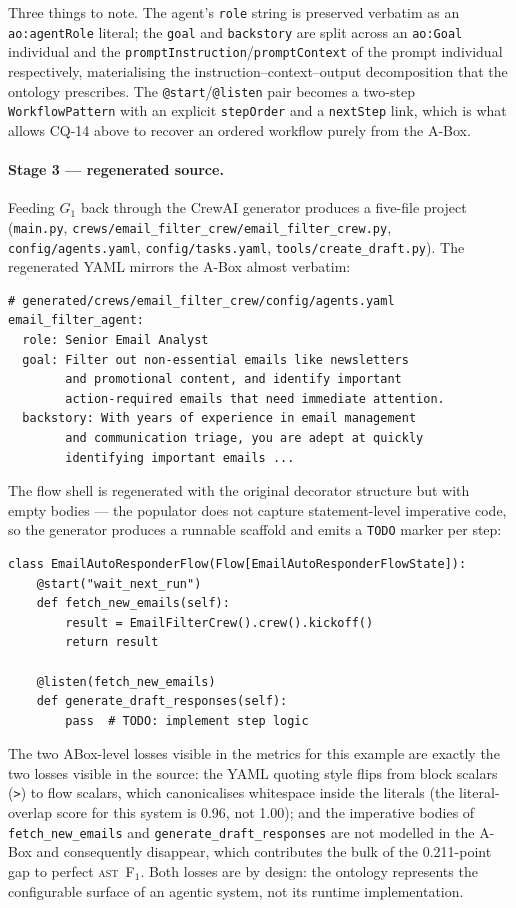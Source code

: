 Three things to note. The agent's \texttt{role} string is preserved
verbatim as an \texttt{ao:agentRole} literal; the \texttt{goal} and
\texttt{backstory} are split across an \texttt{ao:Goal} individual and
the \texttt{promptInstruction}/\texttt{promptContext} of the prompt
individual respectively, materialising the
instruction--context--output decomposition that the ontology
prescribes. The \texttt{@start}/\texttt{@listen} pair becomes a
two-step \texttt{WorkflowPattern} with an explicit \texttt{stepOrder}
and a \texttt{nextStep} link, which is what allows CQ-14 above to
recover an ordered workflow purely from the A-Box.

\paragraph{Stage 3 — regenerated source.}
Feeding $G_1$ back through the CrewAI generator produces a five-file
project (\texttt{main.py}, \texttt{crews/email\_filter\_crew/email\_filter\_crew.py},
\texttt{config/agents.yaml}, \texttt{config/tasks.yaml},
\texttt{tools/create\_draft.py}). The regenerated YAML mirrors the
A-Box almost verbatim:

\begin{verbatim}
# generated/crews/email_filter_crew/config/agents.yaml
email_filter_agent:
  role: Senior Email Analyst
  goal: Filter out non-essential emails like newsletters
        and promotional content, and identify important
        action-required emails that need immediate attention.
  backstory: With years of experience in email management
        and communication triage, you are adept at quickly
        identifying important emails ...
\end{verbatim}

The flow shell is regenerated with the original decorator structure
but with empty bodies — the populator does not capture statement-level
imperative code, so the generator produces a runnable scaffold and
emits a \texttt{TODO} marker per step:

\begin{verbatim}
class EmailAutoResponderFlow(Flow[EmailAutoResponderFlowState]):
    @start("wait_next_run")
    def fetch_new_emails(self):
        result = EmailFilterCrew().crew().kickoff()
        return result

    @listen(fetch_new_emails)
    def generate_draft_responses(self):
        pass  # TODO: implement step logic
\end{verbatim}

The two ABox-level losses visible in the metrics for this example are
exactly the two losses visible in the source: the YAML quoting style
flips from block scalars (\texttt{>}) to flow scalars, which
canonicalises whitespace inside the literals (the literal-overlap
score for this system is 0.96, not 1.00); and the imperative bodies
of \texttt{fetch\_new\_emails} and \texttt{generate\_draft\_responses}
are not modelled in the A-Box and consequently disappear, which
contributes the bulk of the 0.211-point gap to perfect
\textsc{ast}~F$_1$. Both losses are by design: the ontology represents
the configurable surface of an agentic system, not its runtime
implementation.

